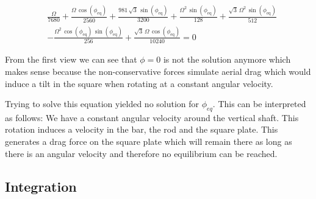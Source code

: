 \begin{equation}
    \begin{split}
        &\frac{\Omega }{7680}+\frac{\Omega \,\cos\left(\phi _{\mathrm{eq}}\right)}{2560}+\frac{981\,\sqrt{3}\,\sin\left(\phi _{\mathrm{eq}}\right)}{3200}+\frac{\Omega ^2\,\sin\left(\phi _{\mathrm{eq}}\right)}{128}+\frac{\sqrt{3}\,\Omega ^2\,\sin\left(\phi _{\mathrm{eq}}\right)}{512}\\
        &-\frac{\Omega ^2\,\cos\left(\phi _{\mathrm{eq}}\right)\,\sin\left(\phi _{\mathrm{eq}}\right)}{256}+\frac{\sqrt{3}\,\Omega \,\cos\left(\phi _{\mathrm{eq}}\right)}{10240} = 0
    \end{split}
\end{equation}

From the first view we can see that $\phi = 0$ is not the solution anymore which makes sense because the non-conservative forces simulate aerial drag which would induce a tilt in the square when rotating at a constant angular velocity.

Trying to solve this equation yielded no solution for $\phi_{eq}$. This can be interpreted as follows: We have a constant angular velocity around the vertical shaft. This rotation induces a velocity in the bar, the rod and the square plate. This generates a drag force on the square plate which will remain there as long as there is an angular velocity and therefore no equilibrium can be reached.



\subsection{Integration}

